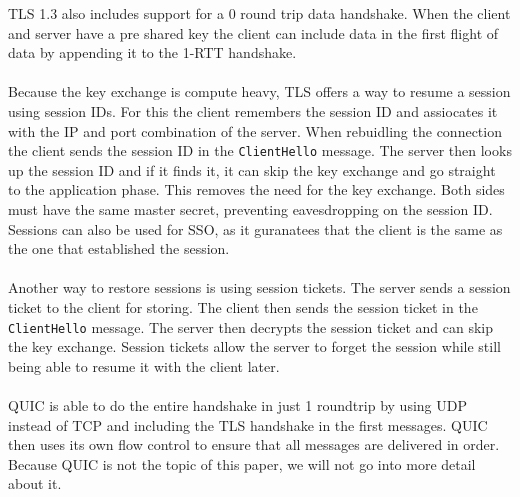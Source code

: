 TLS 1.3 also includes support for a 0 round trip data handshake. When the client and server have a pre shared key the client can include data in the first flight of data by appending it to the 1-RTT handshake.
\\\\
Because the key exchange is compute heavy, TLS offers a way to resume a session using session IDs. For this the client remembers the session ID and assiocates it with the IP and port combination of the server. When rebuidling the connection the client sends the session ID in the \texttt{ClientHello} message. The server then looks up the session ID and if it finds it, it can skip the key exchange and go straight to the application phase. This removes the need for the key exchange. Both sides must have the same master secret, preventing eavesdropping on the session ID. 
\\
Sessions can also be used for SSO, as it guranatees that the client is the same as the one that established the session.
\\\\
Another way to restore sessions is using session tickets. The server sends a session ticket to the client for storing. The client then sends the session ticket in the \texttt{ClientHello} message. The server then decrypts the session ticket and can skip the key exchange. Session tickets allow the server to forget the session while still being able to resume it with the client later.
\\\\
QUIC is able to do the entire handshake in just 1 roundtrip by using UDP instead of TCP and including the TLS handshake in the first messages. QUIC then uses its own flow control to ensure that all messages are delivered in order. Because QUIC is not the topic of this paper, we will not go into more detail about it.